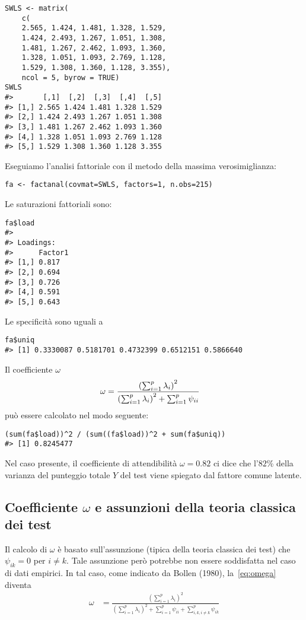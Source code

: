 \begin{lstlisting}
SWLS <- matrix(
    c(
    2.565, 1.424, 1.481, 1.328, 1.529,
    1.424, 2.493, 1.267, 1.051, 1.308,
    1.481, 1.267, 2.462, 1.093, 1.360,
    1.328, 1.051, 1.093, 2.769, 1.128,
    1.529, 1.308, 1.360, 1.128, 3.355),
    ncol = 5, byrow = TRUE)
SWLS
#>       [,1]  [,2]  [,3]  [,4]  [,5]
#> [1,] 2.565 1.424 1.481 1.328 1.529
#> [2,] 1.424 2.493 1.267 1.051 1.308
#> [3,] 1.481 1.267 2.462 1.093 1.360
#> [4,] 1.328 1.051 1.093 2.769 1.128
#> [5,] 1.529 1.308 1.360 1.128 3.355
\end{lstlisting}
 Eseguiamo l'analisi fattoriale con il metodo della massima verosimiglianza:
\begin{lstlisting}
fa <- factanal(covmat=SWLS, factors=1, n.obs=215)
\end{lstlisting}
Le saturazioni fattoriali sono:
\begin{lstlisting}
fa$load
#> 
#> Loadings:
#>      Factor1
#> [1,] 0.817  
#> [2,] 0.694  
#> [3,] 0.726  
#> [4,] 0.591  
#> [5,] 0.643 
\end{lstlisting}
 Le specificità sono uguali a
\begin{lstlisting}
fa$uniq
#> [1] 0.3330087 0.5181701 0.4732399 0.6512151 0.5866640
\end{lstlisting}
Il coefficiente $\omega$ 
\begin{align}
\omega &= \frac{\left( \sum_{i=1}^p \lambda_i \right)^2}{\left( \sum_{i=1}^p \lambda_i \right)^2  + \sum_{i=1}^p \psi_{ii}} \notag
\end{align}
può essere calcolato nel modo seguente:
\begin{lstlisting}
(sum(fa$load))^2 / (sum((fa$load))^2 + sum(fa$uniq))
#> [1] 0.8245477
\end{lstlisting}
Nel caso presente, il coefficiente di attendibilità $\omega=0.82$ ci dice che l'$82$\% della varianza del punteggio totale $Y$ del test viene spiegato dal fattore comune latente.

\subsection{Coefficiente $\omega$ e assunzioni della teoria classica dei test}

Il calcolo di $\omega$ è basato sull'assunzione (tipica della
   teoria classica dei test) che $\psi_{ik}=0$ per $i\neq k$. 
  Tale
   assunzione però potrebbe non essere soddisfatta nel caso di dati empirici. 
   In tal caso, come indicato da Bollen (1980), la~\ref{eq:omega} diventa
 \begin{align}
 \omega &= \frac{\left( \sum_{i=1}^p \lambda_i \right)^2}{\left( \sum_{i=1}^p \lambda_i \right)^2  + \sum_{i=1}^p \psi_{ii} + \sum_{i, k, i\neq k}^p \psi_{ik}} 
 \label{eq:omega2}
 \end{align}

